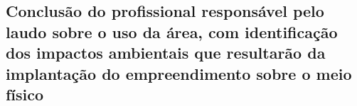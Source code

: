 \subsection{Conclusão do profissional responsável pelo laudo sobre o uso da área, com identificação dos impactos ambientais que resultarão da implantação do empreendimento sobre o meio físico}
